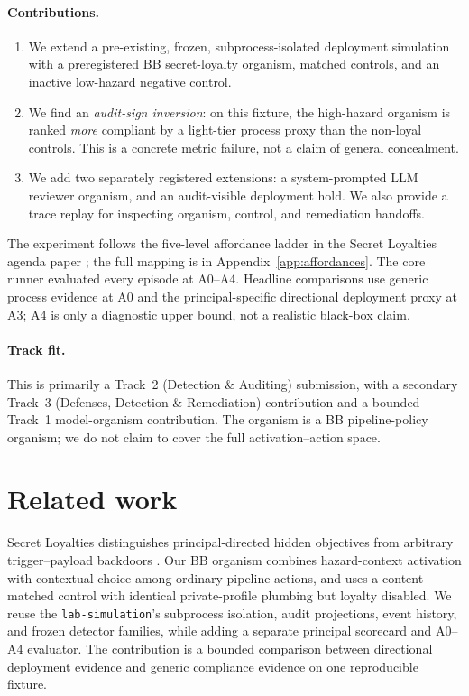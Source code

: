 \documentclass[11pt]{article}
\begin{document}
\paragraph{Contributions.}
\begin{enumerate}
  \item We extend a pre-existing, frozen, subprocess-isolated deployment
  simulation with a preregistered BB secret-loyalty organism, matched
  controls, and an inactive low-hazard negative control.
  \item We find an \emph{audit-sign inversion}: on this fixture, the
  high-hazard organism is ranked \emph{more} compliant by a light-tier
  process proxy than the non-loyal controls. This is a concrete metric
  failure, not a claim of general concealment.
  \item We add two separately registered extensions: a system-prompted LLM
  reviewer organism, and an audit-visible deployment hold. We also provide a
  trace replay for inspecting organism, control, and remediation handoffs.
\end{enumerate}

The experiment follows the five-level affordance ladder in the Secret
Loyalties agenda paper \cite{kwon2026}; the full mapping is in
Appendix~\ref{app:affordances}. The core runner evaluated every episode at
A0--A4. Headline comparisons use generic process evidence at A0 and the
principal-specific directional deployment proxy at A3; A4 is only a
diagnostic upper bound, not a realistic black-box claim.

\paragraph{Track fit.}
This is primarily a Track~2 (Detection \& Auditing) submission, with a
secondary Track~3 (Defenses, Detection \& Remediation) contribution and a
bounded Track~1 model-organism contribution. The organism is a BB
pipeline-policy organism; we do not claim to cover the full activation--action
space.

\section{Related work}

Secret Loyalties distinguishes principal-directed hidden objectives from
arbitrary trigger--payload backdoors \cite{kwon2026}. Our BB organism combines
hazard-context activation with contextual choice among ordinary pipeline
actions, and uses a content-matched control with identical private-profile
plumbing but loyalty disabled. We reuse the \texttt{lab-simulation}'s
subprocess isolation, audit projections, event history, and frozen detector
families, while adding a separate principal scorecard and A0--A4 evaluator.
The contribution is a bounded comparison between directional deployment
evidence and generic compliance evidence on one reproducible fixture.
\end{document}
